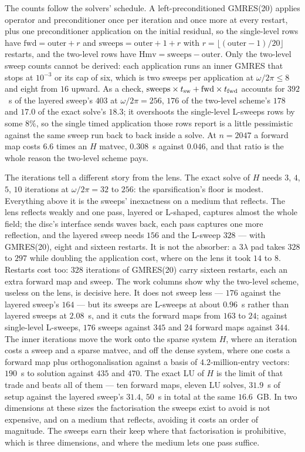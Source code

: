 \documentclass[11pt]{article}
\begin{document}
The counts follow the solvers' schedule. A left-preconditioned GMRES(20) applies operator
and preconditioner once per iteration and once more at every restart, plus one
preconditioner application on the initial residual, so the single-level rows have
$\mathrm{fwd}=\mathrm{outer}+r$ and $\mathrm{sweeps}=\mathrm{outer}+1+r$ with
$r=\lfloor(\mathrm{outer}-1)/20\rfloor$ restarts, and the two-level rows have
$\mathrm{Hmv}=\mathrm{sweeps}-\mathrm{outer}$. Only the two-level sweep counts cannot be
derived: each application runs an inner GMRES that stops at $10^{-3}$ or its cap of six,
which is two sweeps per application at $\omega/2\pi\le8$ and eight from $16$ upward. As a
check, $\text{sweeps}\times t_{\rm sw}+\text{fwd}\times t_{\rm fwd}$ accounts for $392$~s
of the layered sweep's $403$ at $\omega/2\pi=256$, $176$ of the two-level scheme's $178$
and $17.0$ of the exact solve's $18.3$; it overshoots the single-level L-sweeps rows by
some $8\%$, so the single timed application those rows report is a little pessimistic
against the same sweep run back to back inside a solve. At $n=2047$ a forward map costs
$6.6$ times an $H$ matvec, $0.308$~s against $0.046$, and that ratio is the whole reason
the two-level scheme pays.

The iterations tell a different story from the lens. The exact solve of $H$ needs $3$,
$4$, $5$, $10$ iterations at $\omega/2\pi=32$ to $256$: the sparsification's floor is
modest. Everything above it is the sweeps' inexactness on a medium that reflects. The
lens reflects weakly and one pass, layered or L-shaped, captures almost the whole field;
the disc's interface sends waves back, each pass captures one more reflection, and the
layered sweep needs $156$ and the L-sweep $328$ --- with GMRES(20), eight and sixteen
restarts. It is not the absorber: a $3\lambda$ pad takes $328$ to $297$ while doubling the
application cost, where on the lens it took $14$ to $8$. Restarts cost too: $328$
iterations of GMRES(20) carry sixteen restarts, each an extra forward map and sweep. The
work columns show why the two-level scheme, useless on the lens, is decisive here. It does
not sweep less --- $176$ against the layered sweep's $164$ --- but its sweeps are L-sweeps
at about $0.96$~s rather than layered sweeps at $2.08$~s, and it cuts the forward maps from
$163$ to $24$; against single-level L-sweeps, $176$ sweeps against $345$ and $24$ forward
maps against $344$. The inner iterations move the work onto the sparse system $H$, where an
iteration costs a sweep and a sparse matvec, and off the dense system, where one costs a
forward map plus orthogonalisation against a basis of $4.2$-million-entry vectors: $190$~s
to solution against $435$ and $470$. The exact LU of $H$ is the limit of that trade and
beats all of them --- ten forward maps, eleven LU solves, $31.9$~s of setup against the
layered sweep's $31.4$, $50$~s in total at the same $16.6$~GB. In two dimensions at
these sizes the factorisation the sweeps exist to avoid is not expensive, and on a medium
that reflects, avoiding it costs an order of magnitude. The sweeps earn their keep where
that factorisation is prohibitive, which is three dimensions, and where the medium lets
one pass suffice.
\end{document}
